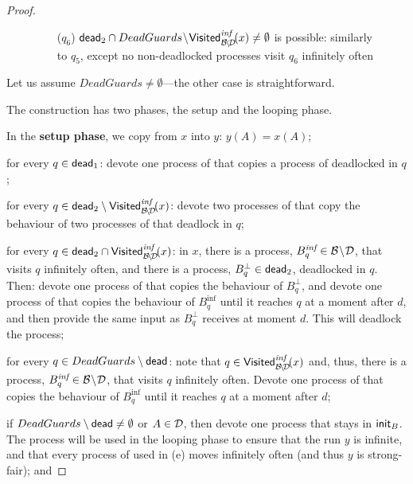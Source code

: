 \begin{proof}
\begin{figure}[hptb]
\begin{mdframed}
{\begin{itemize}
\item[($q_6$)] ${\sf dead}_2 \cap DeadGuards \!\setminus\! \mathsf{Visited}^{\textit{inf}}_{\mathcal{B}\!\setminus\!\mathcal{D}}\!(x) \neq \emptyset$ is possible:
               similarly to $q_5$, except no non-deadlocked processes visit $q_6$ infinitely often
\end{itemize}
}
\label{fig:conj-deadlocks-venn}
\end{mdframed}
\end{figure}

Let us assume $DeadGuards \neq \emptyset$---the other case is straightforward.

The construction has two phases, the setup and the looping phase.

In the {\bf setup phase}, we copy from $x$ into $y$:
\li
\-[a.] $y(A) = x(A)$;

\-[b.] for every $q \in {\sf dead}_1$: 
   devote one process of \cutoffsys that copies 
   a process of \largesys deadlocked in $q$;

\-[c.] for every $q \in {\sf dead}_2 \setminus \mathsf{Visited}^{\textit{inf}}_{\mathcal{B}\!\setminus\!\mathcal{D}}\!(x)$: 
   devote two processes of \cutoffsys that copy 
   the behaviour of two processes of \largesys that deadlock in $q$;

\-[d.] for every $q \in {\sf dead}_2 \cap \mathsf{Visited}^{\textit{inf}}_{\mathcal{B}\!\setminus\!\mathcal{D}}\!(x)$:
   in $x$, 
   there is a process, $B_q^{\textit{inf}} \in \mathcal{B}\!\setminus\!\mathcal{D}$, that visits $q$ infinitely often,
   and there is a process, $B_q^\bot \in {\sf dead}_2$, deadlocked in $q$.
   Then:
\li
   \-[1.] devote one process of \cutoffsys that copies the behaviour of $B_q^\bot$, and
   \-[2.] devote one process of \cutoffsys that copies the behaviour of $B_q^\inf$ 
          until it reaches $q$ at a moment after $d$,
          and then provide the same input as $B_q^\bot$ receives at moment $d$.
          This will deadlock the process;
\il

\-[e.] for every $q \in DeadGuards \setminus {\sf dead}$:
       note that $q \in \mathsf{Visited}^{\textit{inf}}_{\mathcal{B}\!\setminus\!\mathcal{D}}\!(x)$ and, thus, there is a process, 
       $B_q^{\textit{inf}} \in \mathcal{B}\!\setminus\!\mathcal{D}$, 
       that visits $q$ infinitely often.
       Devote one process of \cutoffsys that copies the behaviour of $B_q^\inf$ 
       until it reaches $q$ at a moment after $d$;

\-[f.] if $DeadGuards \setminus {\sf dead} \neq \emptyset$ 
       or $A \in \mathcal{D}$,
       then devote one process that stays in ${\sf init}_B$.
       The process will be used in the looping phase to ensure that the run $y$ is infinite,
       and that every process of \cutoffsys used in (e) 
       moves infinitely often (and thus $y$ is strong-fair);
       and


\end{proof}
